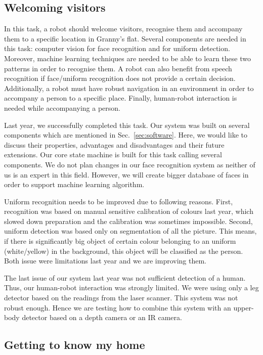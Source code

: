 \subsection{Welcoming visitors}

In this task, a robot should welcome visitors, recognise them and accompany them to a specific location in Granny's flat. Several components are needed in this task: computer vision for face recognition and for uniform detection. Moreover, machine learning techniques are needed to be able to learn these two patterns in order to recognise them. A robot can also benefit from speech recognition if face/uniform recognition does not provide a certain decision. Additionally, a robot must have robust navigation in an environment in order to accompany a person to a specific place. 
Finally, human-robot interaction is needed while accompanying a person.

Last year, we successfully completed this task. Our system was built on several components which are mentioned in Sec.~\ref{sec:software}. 
Here, we would like to discuss their properties, advantages and disadvantages and their future extensions. 
Our core state machine is built for this task calling several components. 
We do not plan changes in our face recognition system as neither of us is an expert in this field. 
However, we will create bigger database of faces in order to support machine learning algorithm.

Uniform recognition needs to be improved due to following reasons.
First, recognition was based on manual sensitive calibration of colours last year, which slowed down preparation and the calibration was sometimes impossible. 
Second, uniform detection was based only on segmentation of all the picture. This means, if there is significantly big object of certain colour belonging to an uniform (white/yellow) in the background, this object will be classified as the person. 
Both issue were limitations last year and we are improving them.  

The last issue of our system last year was not sufficient detection of a human. Thus, our human-robot interaction was strongly limited. 
We were using only a leg detector based on the readings from the laser scanner. 
This system was not robust enough. 
Hence we are testing how to combine this system with an upper-body detector based on a depth camera or an IR camera.

\subsection{Getting to know my home}

